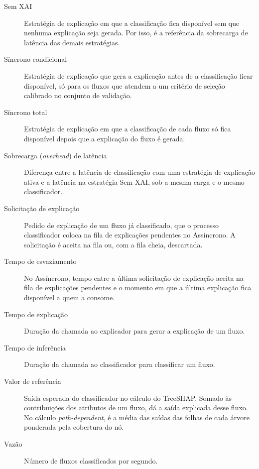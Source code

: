 \documentclass[
  12pt,
  oneside,
  a4paper,
  chapter=TITLE,
  sumario=tradicional,
  english,
  brazil
]{abntex2}
\begin{document}
\begin{description}
  \item[Sem XAI]\label{gl:sem-xai} Estratégia de explicação em que a classificação fica disponível sem que nenhuma explicação seja gerada. Por isso, é a referência da sobrecarga de latência das demais estratégias.
  \item[Síncrono condicional]\label{gl:sincrono-condicional} Estratégia de explicação que gera a explicação antes de a classificação ficar disponível, só para os fluxos que atendem a um critério de seleção calibrado no conjunto de validação.
  \item[Síncrono total]\label{gl:sincrono-total} Estratégia de explicação em que a classificação de cada fluxo só fica disponível depois que a explicação do fluxo é gerada.
  \item[Sobrecarga (\emph{overhead}) de latência]\label{gl:sobrecarga} Diferença entre a latência de classificação com uma estratégia de explicação ativa e a latência na estratégia Sem XAI, sob a mesma carga e o mesmo classificador.
  \item[Solicitação de explicação]\label{gl:solicitacao} Pedido de explicação de um fluxo já classificado, que o processo classificador coloca na fila de explicações pendentes no Assíncrono. A solicitação é aceita na fila ou, com a fila cheia, descartada.
  \item[Tempo de esvaziamento]\label{gl:esvaziamento} No Assíncrono, tempo entre a última solicitação de explicação aceita na fila de explicações pendentes e o momento em que a última explicação fica disponível a quem a consome.
  \item[Tempo de explicação]\label{gl:tempo-explicacao} Duração da chamada ao explicador para gerar a explicação de um fluxo.
  \item[Tempo de inferência]\label{gl:tempo-inferencia} Duração da chamada ao classificador para classificar um fluxo.
  \item[Valor de referência]\label{gl:valor-referencia} Saída esperada do classificador no cálculo do TreeSHAP. Somado às contribuições dos atributos de um fluxo, dá a saída explicada desse fluxo. No cálculo \emph{path-dependent}, é a média das saídas das folhas de cada árvore ponderada pela cobertura do nó.
  \item[Vazão]\label{gl:vazao} Número de fluxos classificados por segundo.
\end{description}
\end{document}
